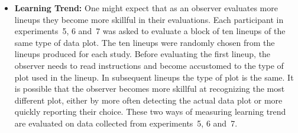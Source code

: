 \documentclass[10pt]{article}\usepackage[]{graphicx}\usepackage[]{xcolor}
\begin{document}
\begin{itemize}
\item{\bf Learning Trend:} One might expect that as an observer evaluates more lineups they  become more skillful in their evaluations. Each participant in  experiments~5, 6 and~7 was asked to evaluate a block of  ten lineups of the same type of data plot. The ten lineups were randomly chosen from the lineups  produced for each study. Before evaluating the first lineup, the observer needs to read instructions and become accustomed to the type of plot used in the lineup. In subsequent lineups  the type of plot is the same. It is possible that the observer becomes more skillful at recognizing the most different plot, either by more often detecting the actual data plot or more quickly reporting their choice. These two ways of measuring learning trend are evaluated on data collected from experiments~5, 6 and~7.







\end{itemize}
\end{document}
